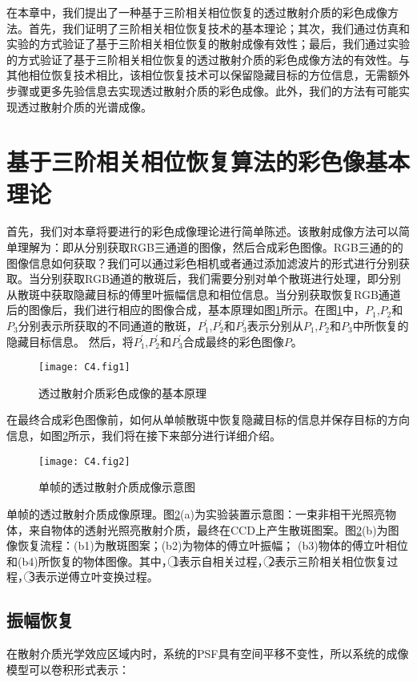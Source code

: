 在本章中，我们提出了一种基于三阶相关相位恢复的透过散射介质的彩色成像方法。首先，我们证明了三阶相关相位恢复技术的基本理论；其次，我们通过仿真和实验的方式验证了基于三阶相关相位恢复的散射成像有效性；最后，我们通过实验的方式验证了基于三阶相关相位恢复的透过散射介质的彩色成像方法的有效性。与其他相位恢复技术相比，该相位恢复技术可以保留隐藏目标的方位信息，无需额外步骤或更多先验信息去实现透过散射介质的彩色成像。此外，我们的方法有可能实现透过散射介质的光谱成像。

\section{基于三阶相关相位恢复算法的彩色像基本理论}

首先，我们对本章将要进行的彩色成像理论进行简单陈述。该散射成像方法可以简单理解为：即从分别获取RGB三通道的图像，然后合成彩色图像。RGB三通的的图像信息如何获取？我们可以通过彩色相机或者通过添加滤波片的形式进行分别获取。当分别获取RGB通道的散斑后，我们需要分别对单个散斑进行处理，即分别从散斑中获取隐藏目标的傅里叶振幅信息和相位信息。当分别获取恢复RGB通道后的图像后，我们进行相应的图像合成，基本原理如图\ref{fig:4.1}所示。在图\ref{fig:4.1}中，$P_1$,$P_2$和$P_3$分别表示所获取的不同通道的散斑，$P_1^{\prime}$,$P_2^{\prime}$和$P_3^{\prime}$表示分别从$P_1$,$P_2$和$P_3$中所恢复的隐藏目标信息。
然后，将$P_1^{\prime}$,$P_2^{\prime}$和$P_3^{\prime}$合成最终的彩色图像$P$。

\begin{figure}[htp]
	\centering
	\texttt{[image: C4.fig1]}
	\caption{透过散射介质彩色成像的基本原理}
	\label{fig:4.1}
\end{figure}
在最终合成彩色图像前，如何从单帧散斑中恢复隐藏目标的信息并保存目标的方向信息，如图\ref{fig:4.2}所示，我们将在接下来部分进行详细介绍。
\begin{figure}[htp]
	\centering
	\texttt{[image: C4.fig2]}
	\caption{单帧的透过散射介质成像示意图}
	\label{fig:4.2}
\end{figure}
单帧的透过散射介质成像原理。图\ref{fig:4.2}(a)为实验装置示意图：一束非相干光照亮物体，来自物体的透射光照亮散射介质，最终在CCD上产生散斑图案。图\ref{fig:4.2}(b)为图像恢复流程：(b1)为散斑图案；(b2)为物体的傅立叶振幅； (b3)物体的傅立叶相位和(b4)所恢复的物体图像。其中，{\large \textcircled{\normalsize 1}}表示自相关过程，{\large \textcircled{\normalsize 2}}表示三阶相关相位恢复过程，{\large \textcircled{\normalsize 3}}表示逆傅立叶变换过程。

\subsection{振幅恢复}
在散射介质光学效应区域内时，系统的PSF具有空间平移不变性，所以系统的成像模型可以卷积形式表示：

